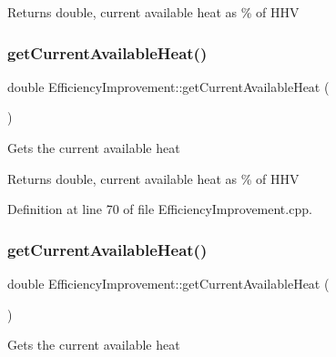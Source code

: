 \begin{DoxyReturn}{Returns}
double, current available heat as \% of H\+HV 
\end{DoxyReturn}
\mbox{\label{class_efficiency_improvement_a4f1ef470ee88c9d3ac05be0bd5755157}} 
\subsubsection{\texorpdfstring{get\+Current\+Available\+Heat()}{getCurrentAvailableHeat()}\hspace{0.1cm}{\footnotesize\ttfamily [2/3]}}
{\footnotesize\ttfamily double Efficiency\+Improvement\+::get\+Current\+Available\+Heat (\begin{DoxyParamCaption}{ }\end{DoxyParamCaption})}

Gets the current available heat

\begin{DoxyReturn}{Returns}
double, current available heat as \% of H\+HV 
\end{DoxyReturn}


Definition at line 70 of file Efficiency\+Improvement.\+cpp.

\mbox{\label{class_efficiency_improvement_a4f1ef470ee88c9d3ac05be0bd5755157}} 
\subsubsection{\texorpdfstring{get\+Current\+Available\+Heat()}{getCurrentAvailableHeat()}\hspace{0.1cm}{\footnotesize\ttfamily [3/3]}}
{\footnotesize\ttfamily double Efficiency\+Improvement\+::get\+Current\+Available\+Heat (\begin{DoxyParamCaption}{ }\end{DoxyParamCaption})}

Gets the current available heat

